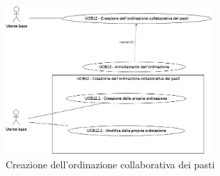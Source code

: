 \newpage
{}
\label{usecase:Creazione dell'ordinazione collaborativa dei pasti}

\begin{figure}[h]
	\centering
	\includegraphics[width=0.7\textwidth]{./uml/UCB12-13.png} 
	\caption{Creazione dell'ordinazione collaborativa dei pasti}
	\label{fig:UCB12-13}
  \end{figure}


